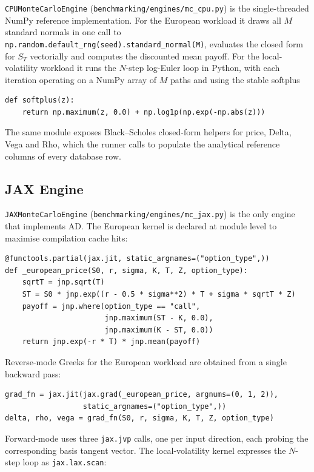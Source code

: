 \texttt{CPUMonteCarloEngine} (\texttt{benchmarking/engines/mc\_cpu.py}) is the
single-threaded NumPy reference implementation. For the European workload it
draws all $M$ standard normals in one call to
\texttt{np.random.default\_rng(seed).standard\_normal(M)}, evaluates the closed
form for $S_T$ vectorially and computes the discounted mean payoff. For the
local-volatility workload it runs the $N$-step log-Euler loop in Python, with
each iteration operating on a NumPy array of $M$ paths and using the stable
softplus

\begin{verbatim}
def softplus(z):
    return np.maximum(z, 0.0) + np.log1p(np.exp(-np.abs(z)))
\end{verbatim}

The same module exposes Black--Scholes closed-form helpers for price, Delta,
Vega and Rho, which the runner calls to populate the analytical reference
columns of every database row.

\subsection{JAX Engine}
\label{sec:impl-jax}

\texttt{JAXMonteCarloEngine} (\texttt{benchmarking/engines/mc\_jax.py}) is the
only engine that implements AD. The European kernel is declared at module level
to maximise compilation cache hits:

\begin{verbatim}
@functools.partial(jax.jit, static_argnames=("option_type",))
def _european_price(S0, r, sigma, K, T, Z, option_type):
    sqrtT = jnp.sqrt(T)
    ST = S0 * jnp.exp((r - 0.5 * sigma**2) * T + sigma * sqrtT * Z)
    payoff = jnp.where(option_type == "call",
                       jnp.maximum(ST - K, 0.0),
                       jnp.maximum(K - ST, 0.0))
    return jnp.exp(-r * T) * jnp.mean(payoff)
\end{verbatim}

Reverse-mode Greeks for the European workload are obtained from a single
backward pass:

\begin{verbatim}
grad_fn = jax.jit(jax.grad(_european_price, argnums=(0, 1, 2)),
                  static_argnames=("option_type",))
delta, rho, vega = grad_fn(S0, r, sigma, K, T, Z, option_type)
\end{verbatim}

Forward-mode uses three \texttt{jax.jvp} calls, one per input direction, each
probing the corresponding basis tangent vector. The local-volatility kernel
expresses the $N$-step loop as \texttt{jax.lax.scan}:

